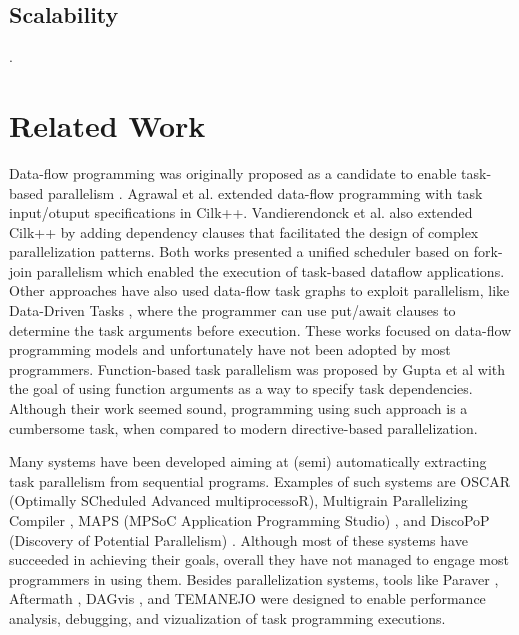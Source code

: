 \documentclass[sigplan,10pt,review,anonymous]{acmart}
\begin{document}
\subsection{Scalability}.

\section{Related Work}
\label{sec:rw}

Data-flow programming was originally proposed as a candidate to enable
task-based parallelism \cite{agrawal:ipdps:2010, chan:spaa:2007,
gupta:micro:2011}.  Agrawal et al. \cite{agrawal:ipdps:2010}  extended
data-flow programming  with task input/otuput  specifications in  Cilk++.
Vandierendonck et al.  \cite{vandierendonck:hotpar:2011} also extended Cilk++
by adding dependency clauses that facilitated the design of complex
parallelization patterns. Both works presented a unified scheduler based on
fork-join parallelism \cite{vandierendonck:pact:2011} which enabled the
execution of task-based dataflow applications. Other approaches have also used
data-flow task graphs to exploit parallelism, like Data-Driven Tasks
\cite{tasirlar:icpp:2011}, where the programmer can use put/await clauses to
determine the task arguments before execution.  These works focused on
data-flow programming  models and unfortunately  have not been adopted by most
programmers. Function-based task parallelism was proposed by Gupta et al
\cite{gupta:micro:2011} with the goal of using function arguments  as a way to
specify task  dependencies. Although their work seemed sound, programming using
such approach is a cumbersome task, when compared to modern directive-based
parallelization. 

Many systems have been developed aiming at (semi) automatically extracting task
parallelism from sequential programs. Examples of such systems are OSCAR
(Optimally SCheduled Advanced multiprocessoR), Multigrain Parallelizing
Compiler \cite{ishizaka:journal:2000, kasahara:iwlcpc:2000},  MAPS (MPSoC
Application Programming  Studio) \cite{castrillon:tii:2013, ceng:dac:2008}, and
DiscoPoP (Discovery of Potential Parallelism) \cite{discopop, li:jss:2016}.
Although most of these systems have succeeded in achieving their goals, overall
they have not managed to engage most programmers in using them. Besides
parallelization systems, tools like Paraver \cite{extrae, paraver}, Aftermath
\cite{drebes:hipeac:2014}, DAGvis \cite{huynh:wvpa:2015}, and TEMANEJO
\cite{brinkmann:parco:2011, brinkmann:journal:2013, temanejo} were  designed to
enable performance analysis, debugging, and vizualization of task programming
executions. 
\end{document}
